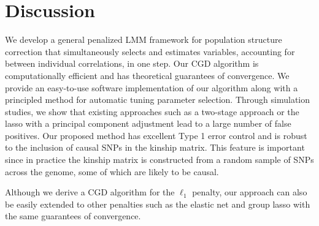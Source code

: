 \documentclass[12pt,letter]{article}\usepackage[]{graphicx}\usepackage[]{color}
\begin{document}













\section{Discussion}

We develop a general penalized LMM framework for population structure correction that simultaneously selects and estimates variables, accounting for between individual correlations, in one step.
Our CGD algorithm is computationally efficient and has theoretical guarantees of convergence.
We provide an easy-to-use software implementation of our algorithm along with a principled method for automatic tuning parameter selection.
Through simulation studies, we show that existing approaches such as a two-stage approach or the lasso with a principal component adjustment lead to a large number of false positives.
Our proposed method has excellent Type 1 error control and is robust to the inclusion of causal SNPs in the kinship matrix. This feature is important since in practice the kinship matrix is constructed from a random sample of SNPs across the genome, some of which are likely to be causal.

Although we derive a CGD algorithm for the $\ell_1$ penalty, our approach can also be easily extended to other penalties such as the elastic net and group lasso with the same guarantees of convergence.

\end{document}
